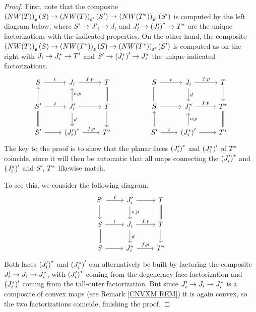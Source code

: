 \documentclass[a4paper,10pt]{article}%
\numberwithin{equation}{section}
\numberwithin{figure}{section}
\theoremstyle{definition} %
\newcommand{\1}{\ensuremath{\mathbbm 1}}%
\begin{document}
\begin{proof}
	First, note that the composite
	$\left(NW(T)\right)_{\mathfrak{s}}({S})
	\to 
	\left(NW(T)\right)_{\mathfrak{s}'}({S'})
	\to 
	\left(NW(T^{\**})\right)_{\mathfrak{s}'}({S'})$
	is computed by the left diagram below,
	where
	$S' \to J'_i \to J_i$
	and 
	$J'_i \to \left(J_i'\right)^{\**} \to T^{\**}$
	are the unique factorizations with the indicated properties.
	On the other hand, the composite
	$\left(NW(T)\right)_{\mathfrak{s}}(S)
	\to 
	\left(NW(T^{\**})\right)_{\mathfrak{s}}(S)
	\to 
	\left(NW(T^{\**})\right)_{\mathfrak{s}'}(S')$
	is computed as on the right
	with 
	$J_i \to J^{\**}_i \to T'$ and
	$S' \to \left(J_i^{\**}\right)' \to J^{\**}_i$
	the unique indicated factorizations.
\begin{equation}
\begin{tikzcd}
	S \ar{r}{t} 
&
	J_i \ar{r}{f,p} 
&
	T \ar[equal]{d}
&&%
	S \ar{r}{t} \ar[equal]{d}
&
	J_i \ar{r}{f,p} \ar{d}{d}
&
	T \ar{d}
\\
	S' \ar{u} \ar{r}{t} \ar[equal]{d}
&
	J'_i \ar{r} \arrow{u}[swap]{o,p} \arrow{d}{d}
&
	T \ar{d}
&&%
	S \ar{r}
&
	J^{\**}_i \arrow{r}{f,p}
&
	T^{\**} \ar[equal]{d}
\\
	S' \ar{r}
&
	\left(J_i'\right)^{\**} \arrow{r}{f,p}
&
	T^{\**}
&&%
	S' \arrow{r}{t} \ar{u}
&
	\left(J_i^{\**}\right)' \ar{r} \arrow{u}[swap]{o,p}
&
	T^{\**}
\end{tikzcd}
\end{equation}
	The key to the proof is to show
	that the planar faces 
	$\left(J_i'\right)^{\**}$ and
	$\left(J_i^{\**}\right)'$
	of $T^{\**}$
	coincide, since it will then be automatic that all maps connecting the
	$\left(J_i'\right)^{\**}$ and
	$\left(J_i^{\**}\right)'$
	and $S'$, $T^{\**}$
	likewise match.

	To see this, we consider the following diagram.
\begin{equation}
\begin{tikzcd}
	S' \ar{r}{t} \ar{d}
&
	J'_i \ar{r} \ar{d}{o,p}
&
	T \ar[equal]{d}
\\
	S  \ar{r}{t} \ar[equal]{d}
&
	J_i \ar{r}{f,p}  \ar{d}{d}
&
	T \ar{d}
\\
	S \ar{r}
&
	J_i^{\**} \ar{r}{f,p}
&
	T^{\**}
\end{tikzcd}
\end{equation}
	Both faces  
	$\left(J'_i\right)^{\**}$ and 
	$\left(J^{\**}_i\right)'
	$
	can alternatively be built by factoring
	the composite 
	$J'_i \to J_i \to J_i^{\**}$,
	with 
	$\left(J'_i\right)^{\**}$ 
	coming from the 
	degeneracy-face factorization
	and 
	$\left(J^{\**}_i\right)'$
	coming from the 
	tall-outer factorization.
	But since 
	$J'_i \to J_i \to J_i^{\**}$
	is a composite of convex maps 
	(see Remark \ref{CNVXM REM})
	it is again convex, 
	so the two factorizations coincide, 
	finishing the proof.
\end{proof}
\end{document}
